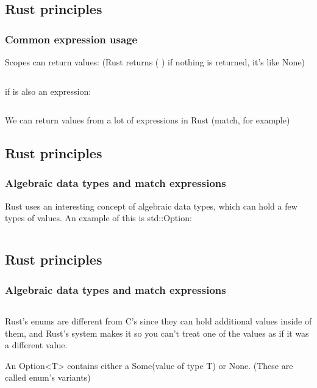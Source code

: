 \documentclass[usenames,twocolumn,dvipsnames,10pt,a4wide]{article}
\begin{document}
\inputminted[fontsize=\normalsize]{rust}{code/expression2.rs}



\subsection{Rust principles}
\subsubsection{Common expression usage}
\large
Scopes can return values:
(Rust returns ( ) if nothing is returned, it's like None)
\inputminted[fontsize=\normalsize]{rust}{code/expression3.rs}

if
is also an expression:
\inputminted[fontsize=\normalsize]{rust}{code/expression4.rs}

\normalsize
We can return values from a lot of expressions in Rust 
(match, for example)


\subsection{Rust principles}
\subsubsection{Algebraic data types and match expressions}
\large
Rust uses an interesting concept of algebraic 
data types, which can hold a few types of values. 
An example of this is std::Option:

\inputminted[fontsize=\normalsize]{rust}{code/option1.rs}



\subsection{Rust principles}
\subsubsection{Algebraic data types and match expressions}
\large
\inputminted[fontsize=\normalsize]{rust}{code/option1.rs}

\normalsize
Rust's enums are different from C's since they can hold additional
values inside of them, and Rust's system makes it so you can't
treat one of the values as if it was a different value.


An Option<T>
contains either a Some(value of type T)
or None.
(These are called enum's variants)
\end{document}

